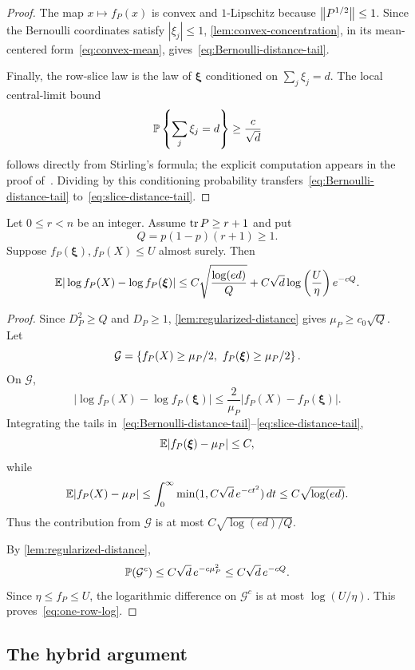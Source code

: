 \begin{proof}
The map $x\mapsto f_P(x)$ is convex and $1$-Lipschitz because $\left\|P^{1/2}\right\|\le1$. Since the Bernoulli coordinates satisfy $|\xi_j|\le1$, 
\cref{lem:convex-concentration}, in its mean-centered form~\eqref{eq:convex-mean}, gives~\eqref{eq:Bernoulli-distance-tail}.

Finally, the row-slice law is the law of $\boldsymbol\xi$ conditioned on $\sum_j\xi_j=d$. The local central-limit bound
\[
  \mathbb P\left\{\sum_j\xi_j=d\right\}\ge\frac c{\sqrt d}
\]
follows directly from Stirling's formula; the explicit computation appears in the proof of~\cite[Corollary~3.5]{LLY26a}. Dividing by this conditioning probability transfers~\eqref{eq:Bernoulli-distance-tail} to~\eqref{eq:slice-distance-tail}.
\end{proof}

\begin{lemma}\label{lem:one-row-log}
Let $0\le r<n$ be an integer. Assume $\operatorname{tr} P\ge r+1$ and put
\[
  Q=p(1-p)(r+1)\ge1.
\]
Suppose $f_P(\boldsymbol\xi),f_P(X)\le U$ almost surely. Then
\begin{equation}\label{eq:one-row-log}
  \mathbb E|\log f_P(X)-\log f_P(\boldsymbol\xi)|
  \le C\sqrt{\frac{\log(ed)}{Q}}
  +C\sqrt d\log\left(\frac U\eta\right)e^{-cQ}.
\end{equation}
\end{lemma}

\begin{proof}
Since $D_P^2\ge Q$ and $D_P\ge1$, 
\cref{lem:regularized-distance} gives $\mu_P\ge c_0\sqrt Q$. Let
\[
  \mathcal G=\set{f_P(X)\ge\mu_P/2,\ f_P(\boldsymbol\xi)\ge\mu_P/2}.
\]
On $\mathcal G$,
\[
  |\log f_P(X)-\log f_P(\boldsymbol\xi)|
  \le\frac2{\mu_P}|f_P(X)-f_P(\boldsymbol\xi)|.
\]
Integrating the tails in~\eqref{eq:Bernoulli-distance-tail}--\eqref{eq:slice-distance-tail},
\[
  \mathbb E|f_P(\boldsymbol\xi)-\mu_P|\le C,
\]
while
\[
  \mathbb E|f_P(X)-\mu_P|
  \le\int_0^\infty\min(1,C\sqrt d\,e^{-ct^2})\,d t
  \le C\sqrt{\log(ed)}.
\]
Thus the contribution from $\mathcal G$ is at most $C\sqrt{\log(ed)/Q}$.

By 
\cref{lem:regularized-distance},
\[
  \mathbb P(\mathcal G^c)
  \le C\sqrt d\,e^{-c\mu_P^2}
  \le C\sqrt d\,e^{-cQ}.
\]
Since $\eta\le f_P\le U$, the logarithmic difference on $\mathcal G^c$ is at most $\log(U/\eta)$. This proves~\eqref{eq:one-row-log}.
\end{proof}

\subsection{The hybrid argument}

